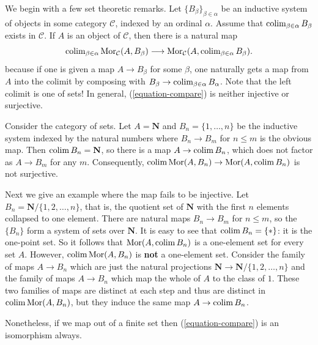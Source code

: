 \medskip\noindent
We begin with a few set theoretic remarks.
Let $\{B_{\beta}\}_{\beta \in \alpha}$ be an inductive system of
objects in some category $\mathcal{C}$, indexed by
an ordinal $\alpha$. Assume that $\mathop{\mathrm{colim}}\nolimits_{\beta \in \alpha} B_\beta$
exists in $\mathcal{C}$. If $A$ is an object of $\mathcal{C}$, then there is a
natural map
\begin{equation}
\label{equation-compare}
\mathop{\mathrm{colim}}\nolimits_{\beta \in \alpha} \mathop{\mathrm{Mor}}\nolimits_\mathcal{C}(A, B_\beta)
\longrightarrow
\mathop{\mathrm{Mor}}\nolimits_\mathcal{C}(A, \mathop{\mathrm{colim}}\nolimits_{\beta \in \alpha} B_\beta).
\end{equation}
because if one is given a map $A \to B_\beta$ for some $\beta$, one
naturally gets a map from $A$  into the colimit by composing with
$B_\beta \to \mathop{\mathrm{colim}}\nolimits_{\beta \in \alpha} B_\alpha$.
Note that the left colimit is one of sets! In general, (\ref{equation-compare})
is neither injective or surjective.

\begin{example}
\label{example-not-surjective}
Consider the category of sets. Let $A = \mathbf{N}$ and
$B_n = \{1, \ldots, n\}$ be the inductive system indexed by the natural numbers
where $B_n \to B_m$ for $n \leq m$ is the obvious map. Then
$\mathop{\mathrm{colim}}\nolimits B_n = \mathbf{N}$, so there is a map
$A \to \mathop{\mathrm{colim}}\nolimits B_n$, which does not factor as $A \to B_m$
for any $m$. Consequently,
$\mathop{\mathrm{colim}}\nolimits \mathop{\mathrm{Mor}}\nolimits(A, B_n) \to \mathop{\mathrm{Mor}}\nolimits(A, \mathop{\mathrm{colim}}\nolimits B_n)$
is not surjective.
\end{example}

\begin{example}
\label{example-not-injective}
Next we give an example where the map fails to be injective. Let $B_n =
\mathbf{N}/\{1,  2, \ldots, n\}$, that is, the quotient set of
$\mathbf{N}$ with the first $n$ elements collapsed to one element.
There are natural maps $B_n \to B_m$ for $n \leq m$, so the
$\{B_n\}$ form a system of sets over $\mathbf{N}$. It is easy to see that
$\mathop{\mathrm{colim}}\nolimits B_n = \{*\}$: it is the one-point set.
So it follows that $\mathop{\mathrm{Mor}}\nolimits(A, \mathop{\mathrm{colim}}\nolimits B_n)$ is a one-element set
for every set $A$.
However, $\mathop{\mathrm{colim}}\nolimits \mathop{\mathrm{Mor}}\nolimits(A , B_n)$ is {\bf not} a one-element set.
Consider the family of maps $A \to B_n$ which are just the natural projections
$\mathbf{N} \to \mathbf{N}/\{1, 2, \ldots, n\}$ and the family of
maps $A \to B_n$ which map the whole of $A$ to the class of $1$.
These two families of maps are distinct at each step and thus are distinct in
$\mathop{\mathrm{colim}}\nolimits \mathop{\mathrm{Mor}}\nolimits(A, B_n)$, but they induce the same map
$A \to \mathop{\mathrm{colim}}\nolimits B_n$.
\end{example}

\noindent
Nonetheless, if we map out of a finite set then
(\ref{equation-compare}) is an isomorphism always.

